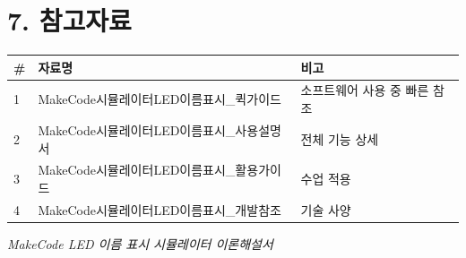 \documentclass[11pt,a4paper]{article}
\begin{document}
\section*{7. 참고자료}

\begin{center}
\renewcommand{\arraystretch}{1.4}
\begin{tabular}{|p{1.5cm}|p{7.6cm}|p{5.9cm}|}
\hline
\rowcolor{tableheader}
\textbf{\#} & \textbf{자료명} & \textbf{비고} \\
\hline
1 & MakeCode시뮬레이터LED이름표시\_퀵가이드 & 소프트웨어 사용 중 빠른 참조 \\
\hline
2 & MakeCode시뮬레이터LED이름표시\_사용설명서 & 전체 기능 상세 \\
\hline
3 & MakeCode시뮬레이터LED이름표시\_활용가이드 & 수업 적용 \\
\hline
4 & MakeCode시뮬레이터LED이름표시\_개발참조 & 기술 사양 \\
\hline
\end{tabular}
\end{center}


\vfill
\begin{center}
\small\color{lightbrown}
\textit{MakeCode LED 이름 표시 시뮬레이터 이론해설서}
\end{center}
\end{document}

